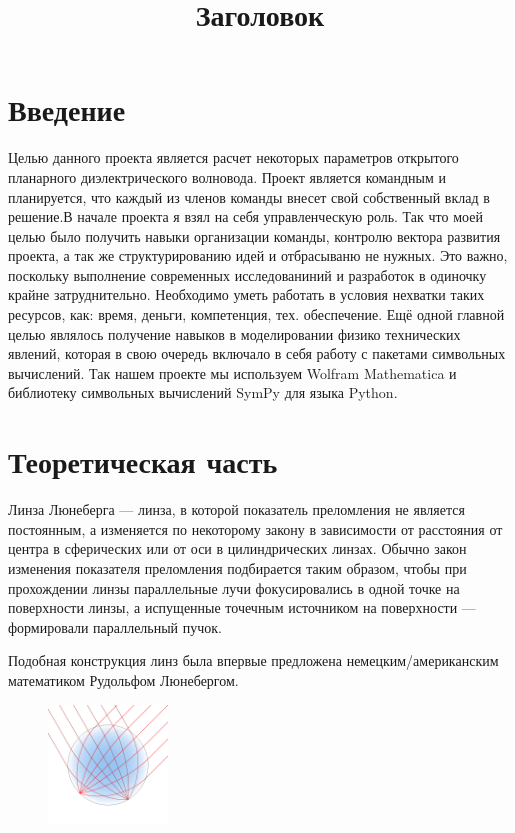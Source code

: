 \documentclass{article}
\title{Заголовок}
\begin{document}
\tableofcontents

\newpage

\section{Введение}

Целью данного проекта является расчет некоторых параметров открытого планарного диэлектрического волновода. Проект является командным и планируется, что каждый из членов команды внесет свой собственный вклад в решение.В начале проекта я взял на себя управленческую роль. Так что моей целью было получить навыки организации команды, контролю вектора развития проекта, а так же структурированию идей и отбрасываню
не нужных. Это важно, поскольку выполнение современных исследованиний и разработок в одиночку крайне затруднительно. Необходимо уметь работать в условия нехватки таких ресурсов, как: время, деньги, компетенция, тех. обеспечение. Ещё одной главной целью являлось получение навыков в моделировании физико технических явлений, которая в свою очередь включало в себя работу с пакетами символьных вычислений. Так нашем проекте мы используем Wolfram Mathematica и библиотеку символьных вычислений SymPy для языка Python.
\newpage

\section{Теоретическая часть}

Линза Люнеберга — линза, в которой показатель преломления не является постоянным, а изменяется по некоторому закону в зависимости от расстояния от центра в сферических или от оси в цилиндрических линзах. Обычно закон изменения показателя преломления подбирается таким образом, чтобы при прохождении линзы параллельные лучи фокусировались в одной точке на поверхности линзы, а испущенные точечным источником на поверхности — формировали параллельный пучок.

Подобная конструкция линз была впервые предложена немецким/американским математиком Рудольфом Люнебергом.\\[10pt]

\begin{figure}[H]
    \centering
    \includegraphics[width=120]{image3.png}
    \caption{}
    \label{tok_per_tweet}
\end{figure}
\end{document}
